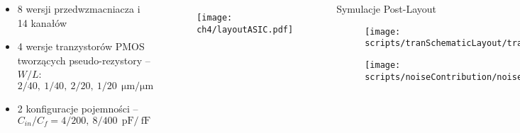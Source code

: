 \begin{frame}{}
    \begin{columns}

    \begin{block}{}
        {\renewcommand\normalsize{\small}%
        \normalsize
        \begin{itemize}
            \item 8 wersji przedwzmacniacza i 14 kanałów
            \item 4 wersje tranzystorów PMOS tworzących pseudo-rezystory  --  $W/L$: $2/40,\ 1/40,\ 2/20,\ 1/20\ \SI{}{\micro\metre / \micro\metre}$
            \item 2 konfiguracje pojemności -- $C_{in}/C_f = 4/200,\ 8/400\ \SI{}{\pico\farad}/\SI{}{\femto\farad}$
        \end{itemize}
        }
    \end{block}

\vspace{-1em}
    \begin{figure}[H]
        \centering
        \texttt{[image: ch4/layoutASIC.pdf]} 
    \end{figure}   

    \begin{block}{
Symulacje Post-Layout
    }

    \begin{figure}[H]
        \centering
        \texttt{[image: scripts/tranSchematicLayout/tranSchematicLayout.pdf]}  
    \end{figure}
    \vspace{-5mm} %
    \begin{figure}[H]
        \centering
        \texttt{[image: scripts/noiseContribution/noiseContributionOut.pdf]}  
    \end{figure}
    \end{block}
    \end{columns}   
  
\end{frame}



